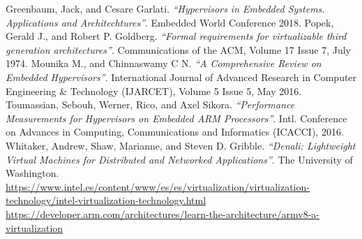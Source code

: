 \documentclass[spanish,12pt,a4paper,oneside]{book}
\begin{document}
\begin{thebibliography}{00}

	  Greenbaum, Jack, and Cesare Garlati. \emph{``Hypervisors in Embedded Systems. Applications and Architechtures''}. Embedded World Conference 2018.
	 Popek, Gerald J., and Robert P. Goldberg. \emph{``Formal requirements for virtualizable third generation architectures''}. Communications of the ACM, Volume 17 Issue 7, July 1974.
	 Mounika M., and Chinnaswamy C N. \emph{``A Comprehensive Review on Embedded Hypervisors''}. International Journal of Advanced Research in Computer Engineering \& Technology (IJARCET), Volume 5 Issue 5, May 2016.
	 Toumassian, Sebouh, Werner, Rico, and Axel Sikora. \emph{``Performance Measurements for Hypervisors on Embedded ARM Processors''}. Intl. Conference on Advances in Computing, Communications and Informatics (ICACCI), 2016.
	 Whitaker, Andrew, Shaw, Marianne, and Steven D. Gribble. \emph{``Denali: Lightweight Virtual Machines for Distributed and Networked Applications''}. The University of Washington.
   \url{https://www.intel.es/content/www/es/es/virtualization/virtualization-technology/intel-virtualization-technology.html}
   \url{https://developer.arm.com/architectures/learn-the-architecture/armv8-a-virtualization}


\end{thebibliography}
\end{document}
